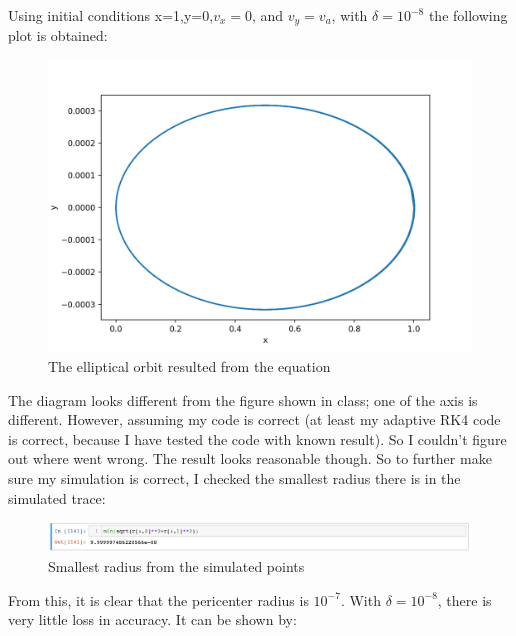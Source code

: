 \documentclass[12pt,letterpaper]{article}
\begin{document}
\begin{enumerate}
    Using initial conditions x=1,y=0,$v_x=0$, and $v_y=v_a$, with $\delta=10^{-8}$ the following plot is obtained:
    \begin{figure}[h]
    \centering
    \includegraphics[width=1.\linewidth]{fig2a.png}
    \caption{The elliptical orbit resulted from the equation}
    \end{figure}
    The diagram looks different from the figure shown in class; one of the axis is different. However, assuming my code is correct (at least my adaptive RK4 code is correct, because I have tested the code with known result). So I couldn't figure out where went wrong. The result looks reasonable though.
    \clearpage
    So to further make sure my simulation is correct, I checked the smallest radius there is in the simulated trace:

    \begin{figure}[h]
    \centering
    \includegraphics[width=1.\linewidth]{fig2b.png}
    \caption{Smallest radius from the simulated points}
    \end{figure}
    
    From this, it is clear that the pericenter radius is $10^{-7}$. With $\delta = 10^{-8}$, there is very little loss in accuracy. It can be shown by:
    

\end{enumerate}
\end{document}
